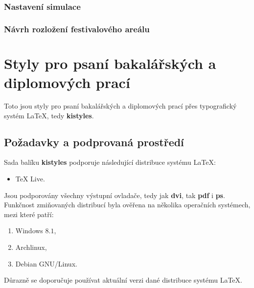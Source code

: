 \documentclass[
  program=itp,
  biblatex,
  figures=false,
  glossaries,
  index
]{kidiplom}
\begin{document}
\subsubsection{Nastavení simulace}
\subsubsection{Návrh rozložení festivalového areálu}




\newcommand{\BibLaTeX}{\textsc{Bib}\LaTeX}


\section{Styly pro psaní bakalářských a diplomových prací}
Toto jsou styly pro psaní bakalářských a diplomových prací přes typografický systém \LaTeX{}, tedy \textbf{kistyles}.

\subsection{Požadavky a podprovaná prostředí}
Sada balíku \textbf{kistyles} podporuje následující distribuce systému \LaTeX{}:
\begin{itemize}
\item \TeX{} Live.
\end{itemize}

Jsou podporovány všechny výstupní ovladače, tedy jak \textbf{dvi}, tak \textbf{pdf} i \textbf{ps}. Funkčnost zmiňovaných distribucí byla ověřena na několika operačních systémech, mezi které patří:
\begin{enumerate}
\item Windows $8.1$,
\item Archlinux,
\item Debian GNU/Linux.
\end{enumerate}

Důrazně se doporučuje používat aktuální verzi dané distribuce systému \LaTeX{}.

\end{document}
